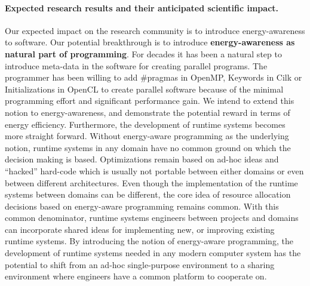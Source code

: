 \documentclass{article}
\begin{document}
\paragraph{Expected research results and their anticipated scientific impact.}
Our expected impact on the research community is to introduce energy-awareness to software. 
Our potential breakthrough is to introduce \textbf{energy-awareness as natural part of programming}.
For decades it has been a natural step to introduce meta-data in the software for creating parallel programs. 
The programmer has been willing to add \#pragmas in OpenMP, Keywords in Cilk or Initializations in OpenCL to create parallel software because of the minimal programming effort and significant performance gain. 
We intend to extend this notion to energy-awareness, and demonstrate the potential reward in terms of energy efficiency. 
Furthermore, the development of runtime systems becomes more straight forward. 
Without energy-aware programming as the underlying notion, runtime systems in any domain have no common ground on which the decision making is based. 
Optimizations remain based on ad-hoc ideas and ``hacked'' hard-code which is usually not portable between either domains or even between different architectures. 
Even though the implementation of the runtime systems between domains can be different, the core idea of resource allocation decisions based on energy-aware programming remains common. 
With this common denominator, runtime systems engineers between projects and domains can incorporate shared ideas for implementing new, or improving existing runtime systems. 
By introducing the notion of energy-aware programming, the development of runtime systems needed in any modern computer system has the potential to shift from an ad-hoc single-purpose environment to a sharing environment where engineers have a common platform to cooperate on.
\end{document}
